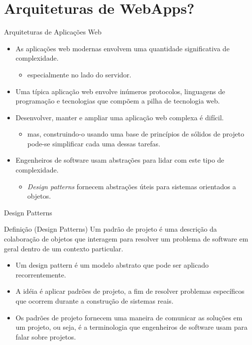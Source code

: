 \section{Arquiteturas de WebApps?}
\begin{frame}{Arquiteturas de Aplicações Web}
  \begin{itemize}
    \item As aplicações \alert{web modernas} envolvem uma quantidade significativa de \alert{complexidade}.
    \begin{itemize}
      \item especialmente no lado do servidor.
    \end{itemize}
    \item Uma típica aplicação web envolve \alert{inúmeros protocolos}, \alert{linguagens de programação} e 
      \alert{tecnologias} que compõem a pilha de tecnologia web. 
    \item Desenvolver, manter e ampliar uma aplicação web complexa é \alert{difícil}.
    \begin{itemize}
      \item mas, construindo-o usando uma \alert{base de princípios de sólidos de projeto} pode-se simplificar 
      cada uma dessas tarefas. 
    \end{itemize}
    \item Engenheiros de software usam \alert{abstrações} para lidar com este tipo de complexidade.
    \begin{itemize}
      \item \textit{Design patterns} fornecem abstrações úteis para sistemas orientados a objetos.
    \end{itemize} 
  \end{itemize}
\end{frame}
\begin{frame}{Design Patterns}
  \begin{exampleblock}{Definição (Design Patterns)}
    Um padrão de projeto é uma descrição da \alert{colaboração de objetos} que interagem para resolver 
    um problema de software em geral dentro de um contexto particular.
  \end{exampleblock}
  \begin{itemize}
    \item Um design pattern é um \alert{modelo abstrato} que pode ser aplicado recorrentemente.
    \item A idéia é aplicar padrões de projeto, a fim de \alert{resolver problemas específicos} que ocorrem 
      durante a construção de sistemas reais.
    \item Os padrões de projeto fornecem uma maneira de \alert{comunicar} as soluções em um projeto, ou seja, 
      é a terminologia que engenheiros de software usam para falar sobre projetos.
  \end{itemize}
\end{frame}
